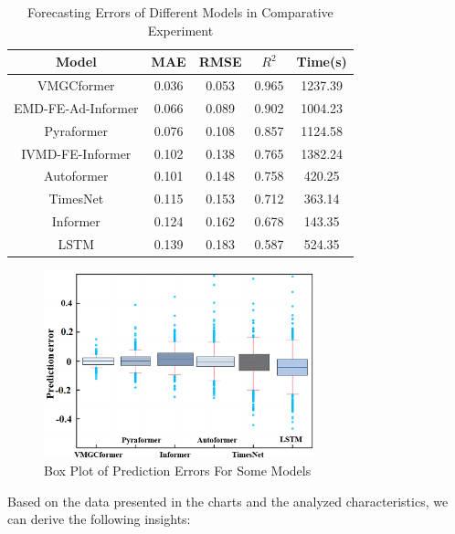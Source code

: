 \documentclass[sn-mathphys,Numbered]{sn-jnl}
\theoremstyle{thmstyleone}%
\theoremstyle{thmstyletwo}%
\theoremstyle{thmstylethree}%
\begin{document}
\begin{table}[h]
\caption{Forecasting Errors of Different Models in Comparative Experiment}\label{error_comp}
\centering
\begin{tabular}{@{}ccccc@{}}
\toprule
\textbf{Model} & \textbf{MAE}& \textbf{RMSE}& \textbf{\(R^2\)} & \textbf{Time(s)}\\
\midrule
VMGCformer & 0.036 & 0.053 & 0.965 & 1237.39 \\
EMD-FE-Ad-Informer & 0.066 & 0.089 & 0.902 & 1004.23 \\
Pyraformer & 0.076 & 0.108 & 0.857 & 1124.58 \\
IVMD-FE-Informer & 0.102 & 0.138 & 0.765 & 1382.24 \\
Autoformer & 0.101 & 0.148 & 0.758 & 420.25 \\
TimesNet & 0.115 & 0.153 & 0.712 & 363.14 \\
Informer & 0.124 & 0.162 & 0.678 & 143.35 \\
LSTM & 0.139 & 0.183 & 0.587 & 524.35 \\
\bottomrule
\end{tabular}
\end{table}

\begin{figure}[h]
    \centering
    \includegraphics[width=0.7\textwidth]{pngs/case.png}
    \caption{ Box Plot of Prediction Errors For Some Models}
    \label{case}
\end{figure}

Based on the data presented in the charts and the analyzed characteristics, we can derive the following insights:
\end{document}

